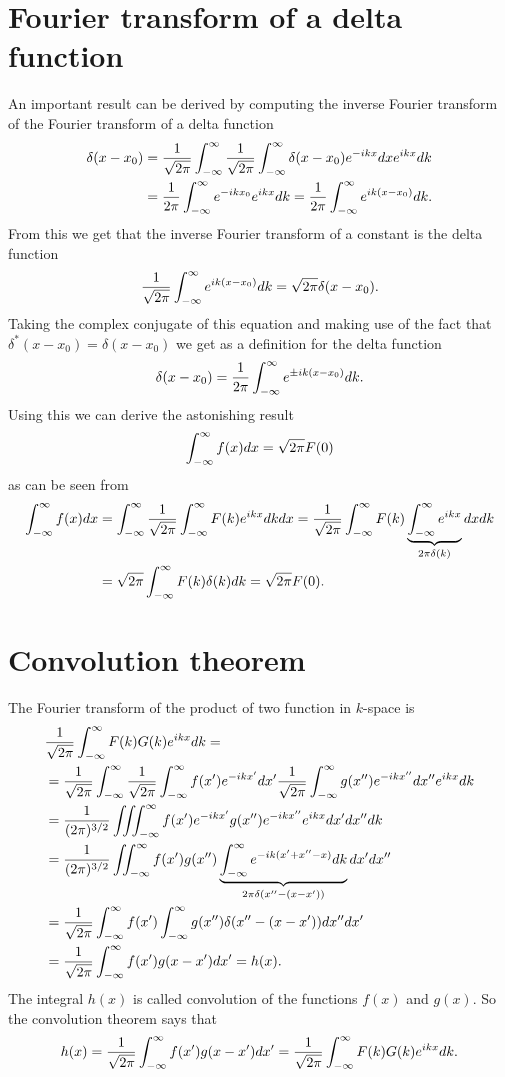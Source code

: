 \section{Fourier transform of a delta function}
An important result can be derived by computing the inverse Fourier
transform of the Fourier transform of a delta function
\begin{align*}
\delta(x-x_0) &= \frac{1}{\sqrt{2\pi}}\int_{-\infty}^{\infty}\frac{1}{\sqrt{2\pi}}\int_{-\infty}^{\infty} \delta(x-x_0) e^{-ikx} dx e^{ikx} dk\\
&=\frac{1}{2\pi}\int_{-\infty}^{\infty} e^{-ikx_0} e^{ikx} dk = \frac{1}{2\pi}\int_{-\infty}^{\infty} e^{ik(x-x_0)} dk.
\end{align*}
From this we get that the inverse Fourier transform of a
constant is the delta function
\begin{align*}
\frac{1}{\sqrt{2\pi}}\int_{-\infty}^{\infty} e^{ik(x-x_0)} dk = \sqrt{2\pi} \delta(x-x_0).
\end{align*}
Taking the complex conjugate of this equation and making use of the fact
that $\delta^*(x-x_0) = \delta(x-x_0)$ we get as a definition for the delta
function
\begin{align}
\delta(x-x_0)= \frac{1}{2\pi}\int_{-\infty}^{\infty} e^{\pm ik(x-x_0)} dk.
\end{align}
Using this we can derive the astonishing result
\begin{align}
\int_{-\infty}^{\infty} f(x) dx = \sqrt{2\pi} F(0)
\end{align}
as can be seen from
\begin{align*}
\int_{-\infty}^{\infty} f(x) dx &= \int_{-\infty}^{\infty} \frac{1}{\sqrt{2\pi}} \int_{-\infty}^{\infty} F(k) e^{ikx} dk dx 
= \frac{1}{\sqrt{2\pi}} \int_{-\infty}^{\infty} F(k) \underbrace{\int_{-\infty}^{\infty} e^{ikx}}_{2\pi \delta(k)} dx dk\\
&= \sqrt{2\pi} \int_{-\infty}^{\infty} F(k) \delta(k) dk = \sqrt{2\pi} F(0).
\end{align*}

\section{Convolution theorem}
The Fourier transform of the product of two function in $k$-space is
\begin{align*}
&\frac{1}{\sqrt{2\pi}}\int_{-\infty}^{\infty} F(k) G(k) e^{ikx} dk =\\
&= \frac{1}{\sqrt{2\pi}} \int_{-\infty}^{\infty} \frac{1}{\sqrt{2\pi}} \int_{-\infty}^{\infty} f(x') e^{-ikx'} dx' \frac{1}{\sqrt{2\pi}}\int_{-\infty}^{\infty} g(x'') e^{-ikx''} dx''
e^{ikx} dk\\
&=\frac{1}{(2\pi)^{3/2}} \iiint^{\infty}_{-\infty} f(x') e^{-ikx'} g(x'') e^{-ikx''} e^{ikx} dx' dx'' dk\\
&=\frac{1}{(2\pi)^{3/2}} \iint_{-\infty}^{\infty} f(x') g(x'') 
\underbrace{\int_{-\infty}^{\infty} e^{-ik(x'+x''-x)} dk}_{2\pi \delta(x''-(x-x'))} dx' dx'' \\
&=\frac{1}{\sqrt{2\pi}}\int_{-\infty}^{\infty} f(x') \int_{-\infty}^{\infty} g(x'') \delta(x''-(x-x')) dx'' dx' \\
&=\frac{1}{\sqrt{2\pi}} \int_{-\infty}^{\infty} f(x') g(x-x') dx' = h(x).
\end{align*}
The integral $h(x)$ is called convolution of the functions $f(x)$ and $g(x)$.
So the convolution theorem says that
\begin{align}
h(x) = \frac{1}{\sqrt{2\pi}} \int_{-\infty}^{\infty} f(x') g(x-x') dx' = \frac{1}{\sqrt{2\pi}}\int_{-\infty}^{\infty} F(k) G(k) e^{ikx} dk.
\end{align}

